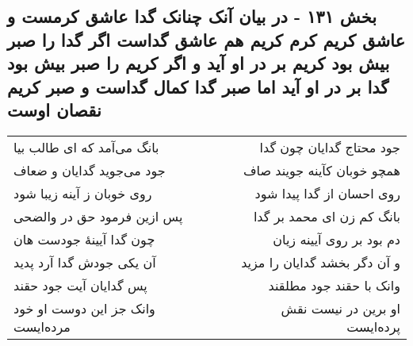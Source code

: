 \begin{center}
\section*{بخش ۱۳۱ - در بیان آنک چنانک گدا عاشق کرمست و عاشق کریم کرم کریم هم عاشق گداست اگر گدا را صبر بیش بود کریم بر در او آید و اگر کریم را صبر بیش بود گدا بر در او آید اما صبر گدا کمال گداست و صبر کریم نقصان اوست}
\label{sec:sh131}
\begin{longtable}{l p{0.5cm} r}
بانگ می‌آمد که ای طالب بیا
&&
جود محتاج گدایان چون گدا
\\
جود می‌جوید گدایان و ضعاف
&&
همچو خوبان کآینه جویند صاف
\\
روی خوبان ز آینه زیبا شود
&&
روی احسان از گدا پیدا شود
\\
پس ازین فرمود حق در والضحی
&&
بانگ کم زن ای محمد بر گدا
\\
چون گدا آیینهٔ جودست هان
&&
دم بود بر روی آیینه زیان
\\
آن یکی جودش گدا آرد پدید
&&
و آن دگر بخشد گدایان را مزید
\\
پس گدایان آیت جود حقند
&&
وانک با حقند جود مطلقند
\\
وانک جز این دوست او خود مرده‌ایست
&&
او برین در نیست نقش پرده‌ایست
\\
\end{longtable}
\end{center}
